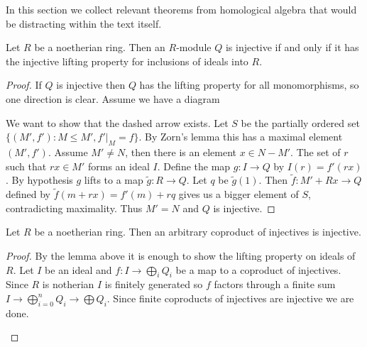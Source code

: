 In this section we collect relevant theorems from homological algebra that would be distracting within the text itself.

\begin{lemma}\cite[Chapter I, theorem 3.2]{CE56} \label{lem:injectives_for_noetherian_ring}
	Let $R$ be a noetherian ring. Then an $R$-module $Q$ is injective if and only if it has the injective lifting property for inclusions of ideals into $R$.
	\begin{proof}
		If $Q$ is injective then $Q$ has the lifting property for all monomorphisms, so one direction is clear. Assume we have a diagram
		\begin{center}
		\end{center}
		We want to show that the dashed arrow exists. Let $S$ be the partially ordered set $\{(M', f'): M \leq M', f'|_M = f\}$. By Zorn's lemma this has a maximal element $(M', f')$. Assume $M' \neq N$, then there is an element $x \in N - M'$. The set of $r$ such that $rx \in M'$ forms an ideal $I$. Define the map $g: I \to Q$ by $I(r) = f'(rx)$. By hypothesis $g$ lifts to a map $\tilde{g}:R \to Q$. Let $q$ be $\tilde{g}(1)$. Then $\tilde{f}: M' + Rx \to Q$ defined by $\tilde{f}(m + rx) = f'(m) + rq$ gives us a bigger element of $S$, contradicting maximality. Thus $M'=N$ and $Q$ is injective.
	\end{proof}
\end{lemma}

\begin{theorem}
	Let $R$ be a noetherian ring. Then an arbitrary coproduct of injectives is injective.
	\begin{proof}
		By the lemma above it is enough to show the lifting property on ideals of $R$. Let $I$ be an ideal and $f:I \to \bigoplus_i Q_i$ be a map to a coproduct of injectives. Since $R$ is notherian $I$ is finitely generated so $f$ factors through a finite sum $I \to \bigoplus_{i=0}^n Q_i \to \bigoplus Q_i$. Since finite coproducts of injectives are injective we are done.
		\begin{center}
		\end{center}
	\end{proof}
\end{theorem}

